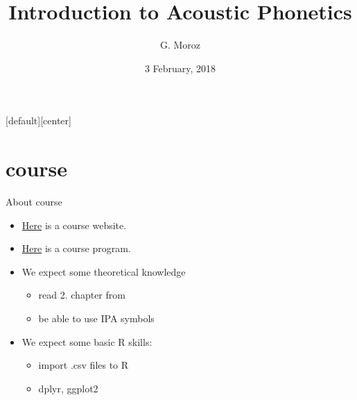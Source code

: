 
[default][center]
\title[]{Introduction to Acoustic Phonetics}
\author[]{G. Moroz}
\date{3 February, 2018}

\frame{\titlepage}
\section{course}
\begin{frame}{About course}
\begin{itemize}
\item \href{https://agricolamz.github.io/m_Instrumental_Phonetics_2016-2017/}{Here} is a course website.
\item \href{https://www.hse.ru/data/2016/09/19/1117088299/program-1542588518-dLqdKf3_0G.pdf}{Here} is a course program.
\item We expect some theoretical knowledge
\begin{itemize}
\item read 2. chapter from \citep{gussenhoven11}
\item be able to use IPA symbols
\end{itemize}
\item We expect some basic R skills:
\begin{itemize}
\item import .csv files to R
\item dplyr, ggplot2
\end{itemize}
\end{itemize}
\end{frame}

